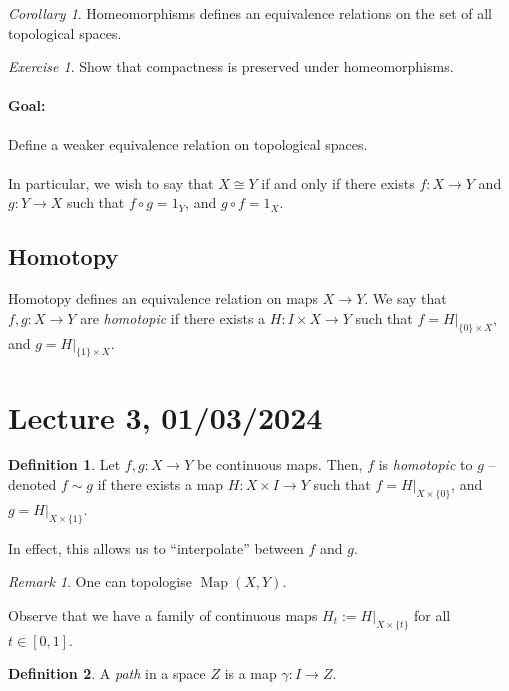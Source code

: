 \documentclass[a4paper]{report}
\theoremstyle{definition}
\newtheorem{definition}{Definition}
\theoremstyle{remark}
\newtheorem{remark}{Remark}
\theoremstyle{proposition}
\theoremstyle{conjecture}
\theoremstyle{lemma}
\theoremstyle{corollary}
\newtheorem{corollary}{Corollary}
\theoremstyle{exercise}
\newtheorem{exercise}{Exercise}
\newcommand{\on}{\operatorname}
\begin{document}
\begin{corollary}
    Homeomorphisms defines an equivalence relations on the set of all
    topological spaces.
\end{corollary}

\begin{exercise}
    Show that compactness is preserved under homeomorphisms.
\end{exercise}

\paragraph{Goal:} Define a weaker equivalence relation on topological spaces.\\\\
In particular, we wish to say that $X \cong Y$ if and only if 
there exists $f : X \to Y$ and $g : Y \to X$ such that $f\circ g = 1_Y$,
and $g\circ f = 1_X$.

\subsection{Homotopy}

Homotopy defines an equivalence relation on maps $X \to Y$. We say that 
$f,g : X \to Y$ are \emph{homotopic} if there exists a $H : I \times X \to Y$
such that $f = H\vert_{\lbrace 0 \rbrace \times X}$, and 
$g = H\vert_{\lbrace 1 \rbrace \times X}$.

\section{Lecture 3, 01/03/2024}

\begin{definition}
Let $f,g : X \to Y$ be continuous maps. Then, $f$ is \emph{homotopic} to $g$ --
denoted $f \sim g$ if there exists a map $H : X \times I \to Y$ such that 
$f = H \vert_{X \times \lbrace 0 \rbrace}$, and $g = H\vert_{X \times \lbrace 1\rbrace}$. 
\end{definition}
In effect, this allows us to ``interpolate'' between $f$ and $g$.

\begin{remark}
    One can topologise $\on{Map}(X,Y)$.
\end{remark}

Observe that we have a family of continuous maps 
$H_t := H\vert_{X \times \lbrace t\rbrace}$ 
for all $ t\in [0,1]$.

\begin{definition}
    A \emph{path} in a space $Z$ is a map $\gamma : I \to Z$. 
\end{definition}
\end{document}
